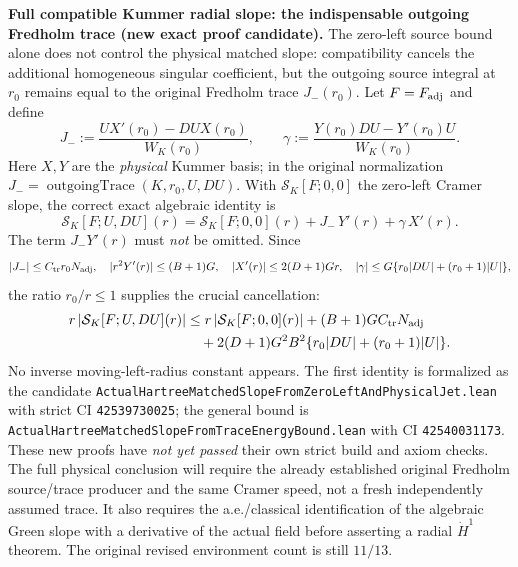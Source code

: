 \documentclass[11pt]{amsart}
\begin{document}
\medskip
\noindent\textbf{Full compatible Kummer radial slope: the indispensable
outgoing Fredholm trace (new exact proof candidate).}
The zero-left source bound alone does not control the physical matched
slope: compatibility cancels the additional homogeneous singular
coefficient, but the outgoing source integral at $r_0$ remains equal
to the original Fredholm trace $J_-(r_0)$.
Let $F=F_{\rm adj}$ and define
\[
 J_-:=\frac{U X'(r_0)-DU X(r_0)}{W_K(r_0)},
 \qquad
 \gamma:=\frac{Y(r_0)DU-Y'(r_0)U}{W_K(r_0)}.
\]
Here $X,Y$ are the \emph{physical} Kummer basis; in the original
normalization $J_-=\operatorname{outgoingTrace}(K,r_0,U,DU)$.
With $\mathcal S_K[F;0,0]$ the zero-left Cramer slope,
the correct exact algebraic identity is
\[
 \boxed{\quad
 \mathcal S_K[F;U,DU](r)=
   \mathcal S_K[F;0,0](r)
   +J_-\,Y'(r)+\gamma\,X'(r).
 \quad}
\]
The term $J_-Y'(r)$ must \emph{not} be omitted. Since
\[
 |J_-|\le C_{\rm tr}r_0 N_{\rm adj},\quad
 |r^2Y'(r)|\le(B+1)G,\quad
 |X'(r)|\le2(D+1)Gr,\quad
 |\gamma|\le G\{r_0|DU|+(r_0+1)|U|\},
\]
the ratio $r_0/r\le1$ supplies the crucial cancellation:
\begin{align*}
 r\,|\mathcal S_K[F;U,DU](r)|
 &\le r\,|\mathcal S_K[F;0,0](r)|
    +(B+1)G C_{\rm tr}N_{\rm adj}\\
 &\quad+2(D+1)G^2 B^2
         \{r_0|DU|+(r_0+1)|U|\}.
\end{align*}
No inverse moving-left-radius constant appears.
The first identity is formalized as the candidate
\texttt{ActualHartreeMatchedSlopeFromZeroLeftAndPhysicalJet.lean}
with strict CI \texttt{42539730025}; the general bound is
\texttt{ActualHartreeMatchedSlopeFromTraceEnergyBound.lean}
with CI \texttt{42540031173}.
These new proofs have \emph{not yet passed} their own strict
build and axiom checks. The full physical conclusion will require
the already established original Fredholm source/trace producer
and the same Cramer speed, not a fresh independently assumed trace.
It also requires the a.e./classical identification of the algebraic
Green slope with a derivative of the actual field before asserting
a radial $\dot H^1$ theorem.
The original revised environment count is still $11/13$.
\end{document}
